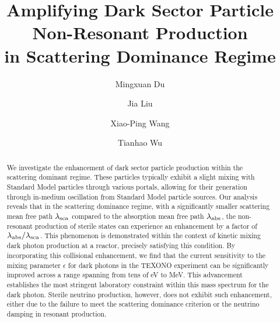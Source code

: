 \documentclass[prd,showpacs,preprintnumbers,amsmath,amssymb,twocolumn,superscriptaddress,notitlepage]{revtex4-2}
\begin{document}
\title{
Amplifying Dark Sector Particle Non-Resonant Production \\
in Scattering Dominance Regime
}


\author{Mingxuan Du}  


%
\author{Jia Liu} 

%
\author{Xiao-Ping Wang} 


%
\author{Tianhao Wu} 





\begin{abstract}
We investigate the enhancement of dark sector particle production within the scattering dominant regime. These particles typically exhibit a slight mixing with Standard Model particles through various portals, allowing for their generation through in-medium oscillation from Standard Model particle sources. Our analysis reveals that in the scattering dominance regime, with a significantly smaller scattering mean free path $\lambda_{\rm sca}$ compared to the absorption mean free path $\lambda_{\rm abs}$, the non-resonant production of sterile states can experience an enhancement by a factor of $\lambda_{\rm abs}/\lambda_{\rm sca}$. This phenomenon is demonstrated within the context of kinetic mixing dark photon production at a reactor, precisely satisfying this condition.
By incorporating this collisional enhancement, we find that the current sensitivity to the mixing parameter $\epsilon$ for dark photons in the TEXONO experiment can be significantly improved across a range spanning from tens of eV to MeV. This advancement establishes the most stringent laboratory constraint within this mass spectrum for the dark photon.
Sterile neutrino production, however, does not exhibit such enhancement, either due to the failure to meet the scattering dominance criterion or the neutrino damping in resonant production.
\end{abstract}
\end{document}
